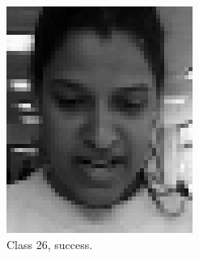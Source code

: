 \documentclass[a4paper, 10pt, conference]{ieeeconf}
\begin{document}
\begin{figure}[!ht]
	\captionsetup[subfigure]{position=b}
        \centering
        \begin{subfigure}{0.125\textwidth}
        \includegraphics[width=\textwidth]{src/class1.png}
                \caption{Class 26, success.}
        \end{subfigure}
        ~
        \begin{subfigure}{0.125\textwidth}

\end{subfigure}
\end{figure}
\end{document}
